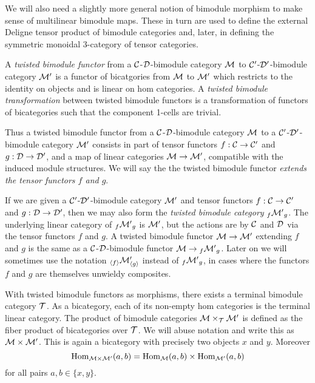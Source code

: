\documentclass{amsart}
\begin{document}
We will also need a slightly more general notion of bimodule morphism to make sense of multilinear bimodule maps. These in turn are used to define the external Deligne tensor product of bimodule categories and, later,  in defining the symmetric monoidal 3-category of tensor categories. 

\begin{definition}
	A {\em twisted bimodule functor} from a $\mathcal C$-$\mathcal D$-bimodule category $\mathcal M$  to $\mathcal C'$-$\mathcal D'$-bimodule category $\mathcal M'$ is a functor of bicatgories from $\mathcal M$ to $\mathcal M'$ which restricts to the identity on objects and is linear on hom categories. A {\em twisted bimodule transformation} between twisted bimodule functors is a transformation of functors of bicategories such that the component 1-cells are trivial.
\end{definition}

Thus a twisted bimodule functor from a $\mathcal C$-$\mathcal D$-bimodule category $\mathcal M$ to a $\mathcal C'$-$\mathcal D'$-bimodule category $\mathcal M'$ consists in part of tensor functors $f:\mathcal C \to \mathcal C'$ and $g:\mathcal D \to \mathcal D'$, and a map of linear categories $\mathcal M \to \mathcal M'$, compatible with the induced module structures. We will say the the twisted bimodule functor {\em extends the tensor functors $f$ and $g$}. 

If we are given a $\mathcal C'$-$\mathcal D'$-bimodule category $\mathcal M'$ and tensor functors $f:\mathcal C \to \mathcal C'$ and $g:\mathcal D \to \mathcal D'$, then we may also form the {\em twisted bimodule category} ${}_f{\mathcal M'}_g$.  The underlying linear category of ${}_f{\mathcal M'}_g$ is $\mathcal M'$, but the actions are by $\mathcal C$ and $\mathcal D$ via the tensor functors $f$ and $g$. A twisted bimodule functor $\mathcal M \to \mathcal M'$ extending $f$ and $g$ is the same as a $\mathcal C$-$\mathcal D$-bimodule functor $\mathcal M \to {}_f{\mathcal M'}_g$.  Later on we will sometimes use the notation ${}_{\langle f \rangle} \mathcal M'_{\langle g \rangle}$ instead of ${}_f{\mathcal M'}_g$, in cases where the functors $f$ and $g$ are themselves unwieldy composites.

With twisted bimodule functors as morphisms, there exists a terminal bimodule category $\mathcal T$. As a bicategory, each of its non-empty hom categories is the terminal linear category. The product of bimodule categories $\mathcal M \times_{\mathcal T} \mathcal M'$ is defined as the fiber product of bicategories over $\mathcal T$. We will abuse notation and write this as $\mathcal M \times \mathcal M'$. This is again a bicategory with precisely two objects $x$ and $y$. Moreover
\begin{equation*}
	\operatorname{Hom}_{\mathcal M \times \mathcal M'}(a,b) = \operatorname{Hom}_\mathcal M(a,b) \times \operatorname{Hom}_{\mathcal M'}(a,b)
\end{equation*}
for all pairs $a,b \in \{ x,y \}$.
\end{document}
